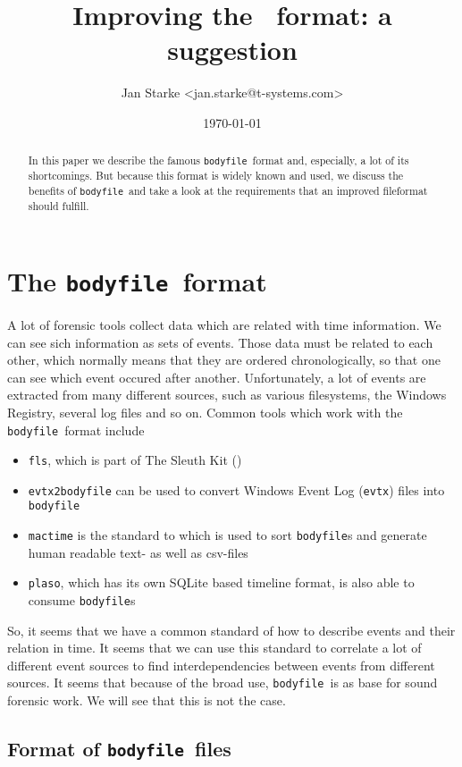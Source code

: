 \documentclass[twocolumn]{article}
\title{Improving the \bodyfile\ format: a suggestion}
\author{Jan Starke <jan.starke@t-systems.com>}
\date{\today}
\newcommand{\bodyfile}{\texttt{bodyfile}}
\begin{document}
\maketitle

\begin{abstract}
    In this paper we describe the famous \bodyfile\ format and, especially, a lot of its shortcomings. But because this format is widely known and used, we discuss the benefits of \bodyfile\ and take a look at the requirements that an improved fileformat should fulfill.
\end{abstract}

\section{The \bodyfile\ format}

A lot of forensic tools collect data which are related with time information. We can see sich information as sets of events. Those data must be related to each other, which normally means that they are ordered chronologically, so that one can see which event occured after another. Unfortunately, a lot of events are extracted from many different sources, such as various filesystems, the Windows Registry, several log files and so on. Common tools which work with the \bodyfile\ format include

\begin{itemize}
    \item \texttt{fls}, which is part of The Sleuth Kit (\cite{SLEUTHKIT})
    \item \texttt{evtx2bodyfile} can be used to convert Windows Event Log (\texttt{evtx}) files into \bodyfile
    \item \texttt{mactime} is the standard to which is used to sort \bodyfile s and generate human readable text- as well as csv-files
    \item \texttt{plaso}, which has its own SQLite based timeline format, is also able to consume \bodyfile s
\end{itemize}

So, it seems that we have a common standard of how to describe events and their relation in time. It seems that we can use this standard to correlate a lot of different event sources to find interdependencies between events from different sources. It seems that because of the broad use, \bodyfile\ is as base for sound forensic work. We will see that this is not the case.

\subsection{Format of \bodyfile\ files}
\end{document}
